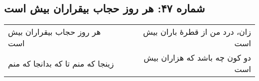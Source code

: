 \begin{center}
\section*{شماره ۴۷: هر روز حجاب بیقراران بیش است}
\label{sec:047}
\begin{longtable}{l p{0.5cm} r}
هر روز حجاب بیقراران بیش است
&&
زان، درد من از قطرهٔ باران بیش است
\\
زینجا که منم تا که بدانجا که منم
&&
دو کون چه باشد که هزاران بیش است
\\
\end{longtable}
\end{center}
